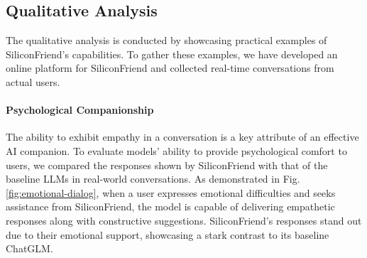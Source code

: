 
\saveSpaceSec
\subsection{Qualitative Analysis}

The qualitative analysis is conducted by showcasing practical examples of SiliconFriend's capabilities. To gather these examples, we have developed an online platform for SiliconFriend and collected real-time conversations from actual users.

\saveSpaceSec
\paragraph{Psychological Companionship}
The ability to exhibit empathy in a conversation is a key attribute of an effective AI companion. To evaluate models' ability to provide psychological comfort to users, we compared the responses shown by SiliconFriend with that of the baseline LLMs in real-world conversations. 
As demonstrated in Fig. \ref{fig:emotional-dialog}, when a user expresses emotional difficulties and seeks assistance from SiliconFriend, the model is capable of delivering empathetic responses along with constructive suggestions. SiliconFriend's responses stand out due to their emotional support, showcasing a stark contrast to its baseline ChatGLM.

